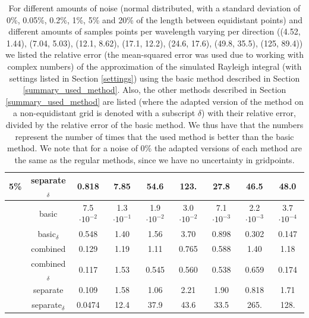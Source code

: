 \begin{table}[H]
\begin{tabular}{|c|c|ccccccc|}
        \multirow{-6}{*}{5\%}
        \cellcolor{white}
        & separate$_\delta$ & 0.818 & 7.85 & 54.6 & 123. & 27.8 & 46.5 & 48.0 \\
        \hline
        \hline
        \rowcolor[gray]{.9}
        \cellcolor{white}
        & basic & 7.5$\cdot 10^{-2}$ & 1.3$\cdot 10^{-1}$ & 1.9$\cdot 10^{-2}$ & 3.0$\cdot 10^{-2}$ & 7.1$\cdot 10^{-3}$ & 2.2$\cdot 10^{-3}$ & 3.7$\cdot 10^{-4 }$ \\
        \cline{2-9}
        \cellcolor{white}
        & basic$_\delta$ & 0.548 & 1.40 & 1.56 & 3.70 & 0.898 & 0.302 & 0.147 \\
        \cellcolor{white}
        & combined & 0.129 & 1.19 & 1.11 & 0.765 & 0.588 & 1.40 & 1.18 \\
        \cellcolor{white}
        & combined$_\delta$ & 0.117 & 1.53 & 0.545 & 0.560 & 0.538 & 0.659 & 0.174 \\
        \cellcolor{white}
        & separate & 0.109 & 1.58 & 1.06 & 2.21 & 1.90 & 0.818 & 1.71 \\
        \cellcolor{white}
        \multirow{-6}{*}{20\%}
        & separate$_\delta$ & 0.0474 & 12.4 & 37.9 & 43.6 & 33.5 & 265. & 128. \\
        \hline
    \end{tabular}
    \caption{For different amounts of noise (normal distributed, with a standard deviation of 0\%, 0.05\%, 0.2\%, 1\%, 5\% and 20\% of the length between equidistant points) and different amounts of samples points per wavelength varying per direction ((4.52, 1.44), (7.04, 5.03), (12.1, 8.62), (17.1, 12.2), (24.6, 17.6), (49.8, 35.5), (125, 89.4)) we listed the relative error (the mean-squared error was used due to working with complex numbers) of the approximation of the simulated Rayleigh integral (with settings listed in Section \ref{settings}) using the basic method described in Section \ref{summary_used_method}.
    Also, the other methods described in Section \ref{summary_used_method} are listed (where the adapted version of the method on a non-equidistant grid is denoted with a subscript $\delta$) with their relative error, divided by the relative error of the basic method.
    We thus have that the numbers represent the number of times that the used method is better than the basic method.
    We note that for a noise of 0\% the adapted versions of each method are the same as the regular methods, since we have no uncertainty in gridpoints.
}
\end{table}
